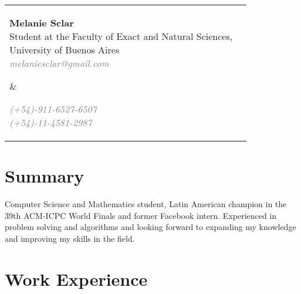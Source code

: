 \documentclass [a4paper, 11pt]{article}
\begin{document}
\noindent \begin{tabularx}{\textwidth}{X r}
  \hspace{-15pt}\parbox[t]{15cm}{
  \hspace{-2pt}\textbf{\huge{Melanie Sclar}} \\
  Student at the Faculty of Exact and Natural Sciences, \\
  University of Buenos Aires \\
  \emph{ \textcolor{gray}{melaniesclar@gmail.com} }
  } &

\parbox[t]{3.8cm}{ \emph{\textcolor{gray}{
  (+54)-911-6527-6507 \\
  (+54)-11-4581-2987 }}
  
}
\end{tabularx}

\sectionfont{\sectionrule{0pt}{0pt}{-.2cm}{1pt}}
\section* {Summary}
Computer Science and Mathematics student, Latin American champion in the 39th ACM-ICPC World Finals and former Facebook intern. Experienced in problem solving and algorithms and looking forward to expanding my knowledge and improving my skills in the field.

\section* {Work Experience}
\end{document}

